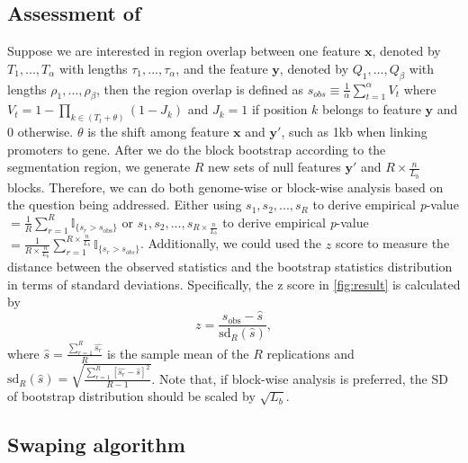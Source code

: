 \documentclass{article}
\begin{document}
\subsection{Assessment of \bootranges}
Suppose we are interested in region overlap between one feature $\bm{x}$, denoted by $T_1, ..., T_\alpha$ with lengths $\tau_1,..., \tau_\alpha$, and the feature $\bm{y}$, denoted by $Q_1, ..., Q_\beta$ with lengths $\rho_1, ..., \rho_\beta$, then the region overlap is defined as $s_{obs} \equiv  \frac{1}{\alpha}\sum_{t=1}^\alpha V_t$ where $V_t=1-\prod_{k\in (T_t+\theta)}(1-J_k)$ and $J_k=1$ if position $k$ belongs to feature $\bm{y}$ and 0 otherwise. $\theta$ is the shift among feature $\bm{x}$ and $\bm{y'}$, such as 1kb when linking promoters to gene. After we do the block bootstrap according to the segmentation region, we generate $R$ new sets of null features $\bm{y'}$ and $R\times \frac{n}{L_b}$ blocks. Therefore, we can do both genome-wise or block-wise analysis based on the question being addressed. Either using $s_{1}, s_{2}, ..., s_{R}$ to derive empirical \textit{p}-value $=  \frac{1}{R} \sum_{r=1}^R \mathbb{I}_{\{s_r > s_\text{obs}\}}$ or $s_{1}, s_{2}, ..., s_{R\times \frac{n}{L_b}}$ to derive empirical \textit{p}-value $=  \frac{1}{R\times \frac{n}{L_b}} \sum_{r=1}^{R\times \frac{n}{L_b}} \mathbb{I}_{\{s_r > s_{obs}\}}$. Additionally, we could used the $z$ score to measure the distance between the observed statistics and the bootstrap statistics distribution in terms of standard deviations. Specifically, the z score in \cref{fig:result} is calculated by $$z = \frac{s_\text{obs} - \widehat{s}}{ \text{sd}_R(\widehat{s})},$$ where $\widehat{s} = \frac{\sum_{r=1}^R \widehat{s_r}}{R}$ is the sample mean of the $R$ replications and $\text{sd}_R(\widehat{s}) = \sqrt{\frac{\sum_{r=1}^R [\widehat{s_r}-\widehat{s}]^2}{R-1}}$.
Note that, if block-wise analysis is preferred, the SD of bootstrap distribution should be scaled by $\sqrt{L_b}$.





\subsection{Swaping algorithm}\label{sec:algorithm}
\end{document}
